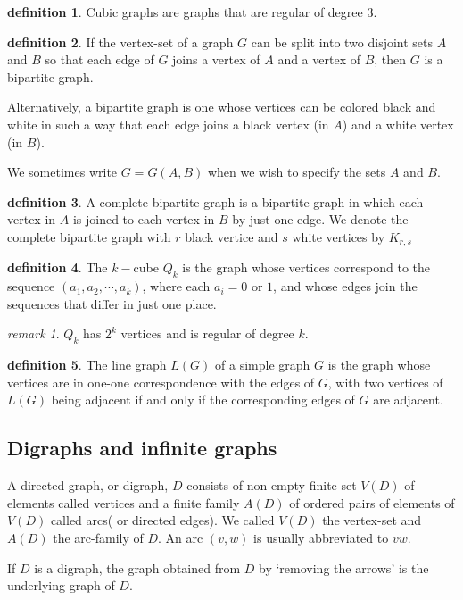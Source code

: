 \documentclass[a4paper,11pt]{article}%
\theoremstyle{remark}
\newtheorem*{remark}{remark}
\theoremstyle{definition}
\theoremstyle{definition}
\theoremstyle{definition}
\theoremstyle{definition}
\newtheorem*{definition}{definition}
\theoremstyle{plain}
\theoremstyle{definition}
\begin{document}
\begin{definition}
    Cubic graphs are graphs that are regular of degree 3.
\end{definition}
\begin{definition}
    If the vertex-set of a graph $G$ can be split 
    into two disjoint sets $A$ and $B$ so that each edge of $G$ joins a
    vertex of $A$ and a vertex of $B$, then $G$ is a bipartite graph.

    Alternatively, a bipartite graph is one whose vertices can be colored 
    black and white in such a way that each edge joins a black vertex (in $A$)
    and a white vertex (in $B$). 

    We sometimes write $G=G(A,B)$ when we wish to specify the sets $A$ and $B$.
\end{definition}
\begin{definition}
    A complete bipartite graph is a bipartite graph in which each vertex in $A$
    is joined to each vertex in $B$ by just one edge. We denote the complete bipartite
    graph with $r$ black vertice and $s$ white vertices by $K_{r,s}$
\end{definition}
\begin{definition}
    The $k-$cube $Q_k$ is the graph whose vertices correspond to 
    the sequence $(a_1,a_2,\cdots,a_k)$, where each $a_i=0$ or $1$,
    and whose edges join the sequences that differ in just one place.
\end{definition}
\begin{remark}
    $Q_k$ has $2^k$ vertices and is regular of degree $k$.
\end{remark}
\begin{definition}
    The line graph $L(G)$ of a simple graph $G$ is the graph whose vertices 
    are in one-one correspondence with the edges of $G$, with two vertices of
    $L(G)$ being adjacent if and only if the corresponding edges of $G$ are adjacent.
\end{definition}
\subsection{Digraphs and infinite graphs}
A directed graph, or digraph, $D$ consists of non-empty finite set $V(D)$
of elements called vertices and a finite family $A(D)$ of ordered pairs of elements 
of $V(D)$ called arcs( or directed edges). We called $V(D)$ the vertex-set 
and $A(D)$ the arc-family of $D$. An arc $(v,w)$ is usually 
abbreviated to $vw$.

If $D$ is a digraph, the graph obtained from $D$ by `removing the arrows'
is the underlying graph of $D$.
\end{document}
